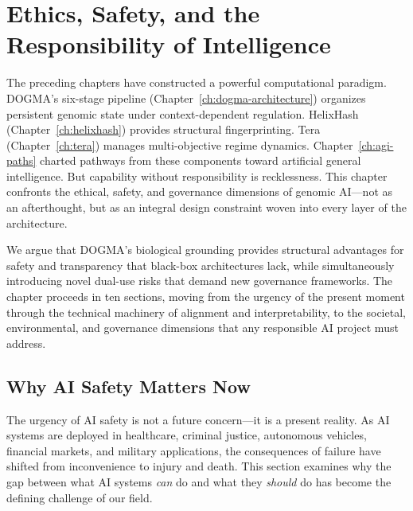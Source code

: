 
\chapter{Ethics, Safety, and the Responsibility of Intelligence}
\label{ch:ethics-safety}


\noindent
The preceding chapters have constructed a powerful computational paradigm.
DOGMA's six-stage pipeline (Chapter~\ref{ch:dogma-architecture}) organizes persistent genomic state under context-dependent regulation.
HelixHash (Chapter~\ref{ch:helixhash}) provides structural fingerprinting.
Tera (Chapter~\ref{ch:tera}) manages multi-objective regime dynamics.
Chapter~\ref{ch:agi-paths} charted pathways from these components toward artificial general intelligence.
But capability without responsibility is recklessness.
This chapter confronts the ethical, safety, and governance dimensions of genomic AI---not as an afterthought, but as an integral design constraint woven into every layer of the architecture.

We argue that DOGMA's biological grounding provides structural advantages for safety and transparency that black-box architectures lack, while simultaneously introducing novel dual-use risks that demand new governance frameworks.
The chapter proceeds in ten sections, moving from the urgency of the present moment through the technical machinery of alignment and interpretability, to the societal, environmental, and governance dimensions that any responsible AI project must address.

\section{Why AI Safety Matters Now}
\label{sec:why-safety-now}

The urgency of AI safety is not a future concern---it is a present reality.
As AI systems are deployed in healthcare, criminal justice, autonomous vehicles, financial markets, and military applications, the consequences of failure have shifted from inconvenience to injury and death.
This section examines why the gap between what AI systems \emph{can} do and what they \emph{should} do has become the defining challenge of our field.


